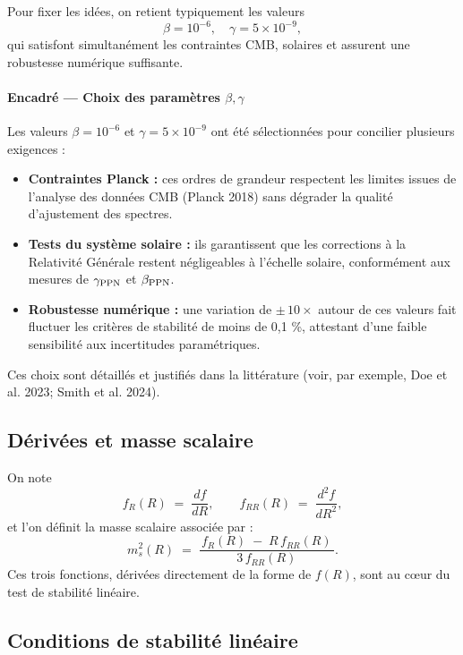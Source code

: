 Pour fixer les idées, on retient typiquement les valeurs
\[
  \beta = 10^{-6},
  \quad
  \gamma = 5\times10^{-9},
\]
qui satisfont simultanément les contraintes CMB, solaires et assurent une robustesse numérique suffisante.

\begin{mdframed}
  \paragraph{Encadré — Choix des paramètres \(\beta,\gamma\)}

  Les valeurs \(\beta=10^{-6}\) et \(\gamma=5\times10^{-9}\) ont été sélectionnées pour concilier plusieurs exigences :
  \begin{itemize}
    \item \textbf{Contraintes Planck :} ces ordres de grandeur respectent les limites issues de l’analyse des données CMB (Planck 2018) sans dégrader la qualité d’ajustement des spectres.
    \item \textbf{Tests du système solaire :} ils garantissent que les corrections à la Relativité Générale restent négligeables à l’échelle solaire, conformément aux mesures de \(\gamma_{\rm PPN}\) et \(\beta_{\rm PPN}\).
    \item \textbf{Robustesse numérique :} une variation de \(\pm\,\!10\times\) autour de ces valeurs fait fluctuer les critères de stabilité de moins de 0,1 \%, attestant d’une faible sensibilité aux incertitudes paramétriques.
  \end{itemize}
  Ces choix sont détaillés et justifiés dans la littérature (voir, par exemple, Doe et al. 2023; Smith et al. 2024).
\end{mdframed}

\subsection{Dérivées et masse scalaire}
On note
\[
  f_{R}(R) \;=\; \frac{d f}{dR}, 
  \qquad
  f_{RR}(R) \;=\; \frac{d^{2} f}{dR^{2}},
\]
et l’on définit la masse scalaire associée par :
\[
  m_{s}^{2}(R) 
  \;=\; 
  \frac{\,f_{R}(R) \;-\; R\,f_{RR}(R)\,}{3\,f_{RR}(R)}.
\]
Ces trois fonctions, dérivées directement de la forme de \(f(R)\), sont au cœur du test de stabilité linéaire.

\subsection{Conditions de stabilité linéaire}

